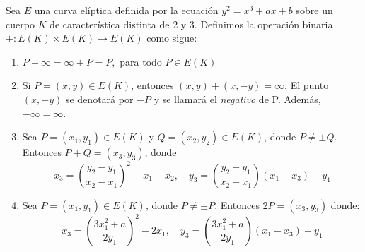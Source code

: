 \begin{definicion}
\label{def:ley de grupo}
Sea $E$ una curva elíptica definida por la ecuación $y^2 = x^3 + a x + b$ sobre un cuerpo $K$ de característica distinta de 2 y 3. Definimos la operación binaria $+: E(K) \times E(K) \to E(K)$ como sigue:
\begin{enumerate}[label=\alph*)]
	\item $P + \infty = \infty + P = P,$ para todo $P \in E(K)$
	\item Si $P = (x, y) \in E(K)$, entonces $(x, y) + (x, -y) = \infty$. El punto $(x, -y)$ se denotará por $-P$ y se llamará el \emph{negativo} de P. Además, $- \infty = \infty$.
	\item Sea $P = (x_1, y_1) \in E(K)$ y $Q = (x_2, y_2) \in E(K)$, donde $P \neq \pm Q$. Entonces $P + Q = (x_3, y_3)$, donde
	$$
	x_3 = \left(\frac{y_2 - y_1}{x_2 - x_1}\right)^2 - x_1 - x_2, \quad
	y_3 = \left(\frac{y_2 - y_1}{x_2 - x_1}\right) (x_1 - x_3) - y_1
	$$
	\item Sea $P = (x_1, y_1) \in E(K)$, donde $P \neq \pm P$. Entonces $2 P = (x_3, y_3)$ donde:
	$$
	x_3 = \left(\frac{3 x_1^2 + a}{2 y_1}\right)^2 - 2 x_1, \quad
	y_3 = \left(\frac{3 x_1^2 + a}{2 y_1}\right) (x_1 - x_3) - y_1
	$$
\end{enumerate}
\end{definicion}
